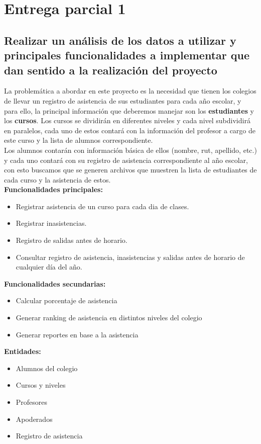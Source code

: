\section{Entrega parcial 1}

\subsection{Realizar un análisis de los datos a utilizar y principales funcionalidades a  implementar que dan sentido a la realización del proyecto}

La problemática a abordar en este proyecto es la necesidad que tienen los colegios de llevar un registro de asistencia de sus estudiantes para cada año escolar, y para ello, la principal información que deberemos manejar son los \textbf{estudiantes} y los \textbf{cursos}. Los cursos se dividirán en diferentes niveles y cada nivel subdividirá en paralelos, cada uno de estos contará con la información del profesor a cargo de este curso y la lista de alumnos correspondiente.\\

Los alumnos contarán con información básica de ellos (nombre, rut, apellido, etc.) y cada uno contará con su registro de asistencia correspondiente al año escolar, con esto buscamos que se generen archivos que muestren la lista de estudiantes de cada curso y la asistencia de estos.\\

\textbf{Funcionalidades principales:}
\begin{itemize}
    \item Registrar asistencia de un curso para cada dia de clases.
    \item Registrar inasistencias.
    \item Registro de salidas antes de horario.
    \item Consultar registro de asistencia, inasistencias y  salidas antes de horario de cualquier día del año.
\end{itemize}

\textbf{Funcionalidades secundarias:}
\begin{itemize}
    \item Calcular porcentaje de asistencia
    \item Generar ranking de asistencia en distintos niveles del colegio
    \item Generar reportes en base a la asistencia
\end{itemize}

\textbf{Entidades:}
\begin{itemize}
    \item Alumnos del colegio
    \item Cursos y niveles
    \item Profesores
    \item Apoderados
    \item Registro de asistencia
\end{itemize}
	
